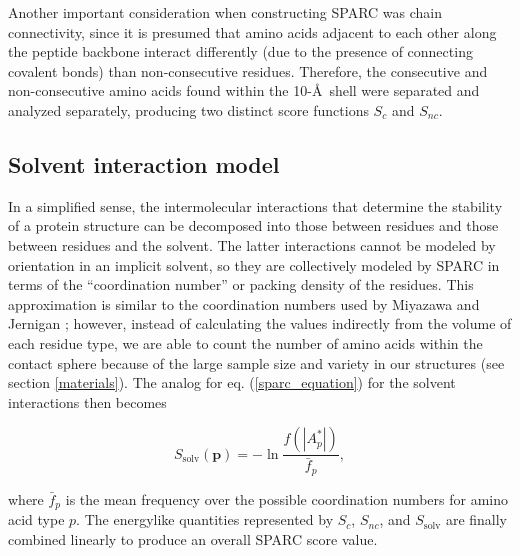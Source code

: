\documentclass[11pt]{article}
\begin{document}
Another important consideration when constructing SPARC was chain connectivity, since it is presumed that amino acids adjacent to each other along the peptide backbone interact differently (due to the presence of connecting covalent bonds) than non-consecutive residues.
Therefore, the consecutive and non-consecutive amino acids found within the 10-\AA\, shell were separated and analyzed separately, producing two distinct score functions $S_c$ and $S_{nc}$.

\subsection{Solvent interaction model}
In a simplified sense, the intermolecular interactions that determine the stability of a protein structure can be decomposed into those between residues and those between residues and the solvent.
The latter interactions cannot be modeled by orientation in an implicit solvent, so they are collectively modeled by SPARC in terms of the ``coordination number'' or packing density of the residues.
This approximation is similar to the coordination numbers used by Miyazawa and Jernigan \cite{miyazawa}; however, instead of calculating the values indirectly from the volume of each residue type, we are able to count the number of amino acids within the contact sphere because of the large sample size and variety in our structures (see section \ref{materials}).
The analog for eq. (\ref{sparc_equation}) for the solvent interactions then becomes

\begin{equation}
S_{\text{solv}}(\textbf{p}) = -\ln{\frac{f(|A_p^*|)}{\bar{f}_p}},
\label{solvent_equation}
\end{equation}

where $\bar{f}_p$ is the mean frequency over the possible coordination numbers for amino acid type $p$.
The energylike quantities represented by $S_c$, $S_{nc}$, and $S_\text{solv}$ are finally combined linearly to produce an overall SPARC score value.
\end{document}
